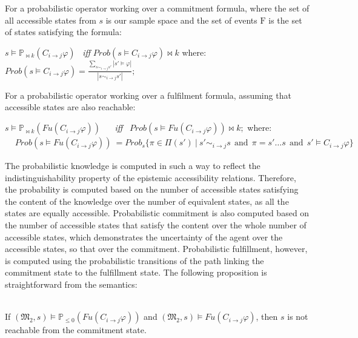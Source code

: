 \begin{definition}
\begin{tabbing}
\end{tabbing}


\noindent For a probabilistic operator working over a commitment formula,
where the set of all accessible states from $s$ is our sample space and the set of events $\mathrm{F}$ is the set of states satisfying the formula: %


\noindent  $s\models \mathbb{P}_{\bowtie k}(C_{i\rightarrow j}\varphi)$
   ~\emph{iff}  $Prob(s \models C_{i\rightarrow j}\varphi) \bowtie \!k$ where: $Prob(s\models C_{i\rightarrow j}\varphi)=\frac{\sum_{s \sim_{i \rightarrow j}s'}|s'\models \varphi| }{|s \sim_{i \rightarrow j}s'| };$


\noindent For a probabilistic operator working over a fulfilment formula,
 assuming that accessible states are also reachable:

\noindent $s\models \mathbb{P}_{\bowtie k}(Fu(C_{i\rightarrow j}\varphi))$
    ~~ \emph{iff}~ $Prob(s \models Fu(C_{i\rightarrow j}\varphi)) \bowtie k;$ where:
\begin{align*}
& Prob(s\models Fu(C_{i\rightarrow j}\varphi))\ = Prob_s\{\pi \in \Pi(s') ~|~ s' \sim_{i \rightarrow j}s ~~\textrm{and}~~ \pi = s' \ldots s ~~\textrm{and}~~ s' \models C_{i\rightarrow j}\varphi\}
\end{align*}


\end{definition}

The probabilistic knowledge is computed in such a way to reflect the indistinguishability property of the epistemic accessibility relations. Therefore, the probability is computed based on the number of accessible states satisfying the content of the knowledge over the number of equivalent states, as all the states are equally accessible. Probabilistic commitment is also computed based on the number of accessible states that satisfy the
content over the whole number of accessible states, which demonstrates the uncertainty of the agent over the accessible states, so that over the commitment. Probabilistic fulfillment, however, is computed using the probabilistic transitions of the path linking the commitment state to the fulfillment state. The following proposition is straightforward from the semantics:

\begin{proposition} \label{proposition-PCTLKC}~\\
If $(\mathfrak{M_2},s)\models \mathbb{P}_{\leq0} (Fu(C_{i \rightarrow
j}\varphi))$ and $(\mathfrak{M_2},s)\models Fu(C_{i \rightarrow
j}\varphi)$, then $s$ is not reachable from the commitment state.
\end{proposition}


